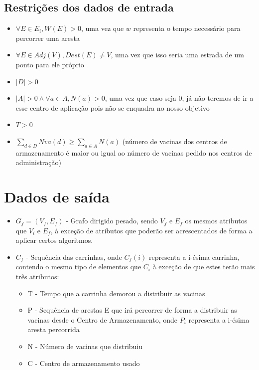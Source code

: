 \documentclass[12pt,a4paper]{report}
\begin{document}
		\subsection{Restrições dos dados de entrada}
		\begin{itemize}
			\item \( \forall E \in E_i, W(E) > 0 \), uma vez que \( w \) representa o tempo necessário para percorrer uma aresta
			\item \( \forall E \in Adj(V), Dest(E) \neq V \), uma vez que isso seria uma estrada de um ponto para ele próprio
			\item \( |D| > 0 \)
			\item \(|A| > 0 \land \forall a \in A, N(a) > 0 \), uma vez que caso seja 0, já não teremos de ir a esse centro de aplicação pois não se enquadra no nosso objetivo
			\item \(T > 0\)
			\item \(\sum_{d \in D} Nva(d) \geq \sum_{a \in A} N(a) \) (número de vacinas dos centros de armazenamento é maior ou igual ao número de vacinas pedido nos centros de administração)
		\end{itemize}


	\section{Dados de saída}
	\begin{itemize}
		\item \( G_f = (V_f, E_f) \) - Grafo dirigido pesado, sendo \( V_f \) e \( E_f \) os mesmos atributos que \( V_i \) e \( E_f \), à exceção de atributos que poderão ser acrescentados de forma a aplicar certos algoritmos.
		\item \(C_f\) - Sequência das carrinhas, onde \( C_f(i) \) representa a i-ésima carrinha, contendo o mesmo tipo de elementos que \( C_i \) à exceção de que estes terão mais três atributos:
		\begin{itemize}
			\item T - Tempo que a carrinha demorou a distribuir as vacinas
			\item P - Sequência de arestas E que irá percorrer de forma a distribuir as vacinas desde o Centro de Armazenamento, onde \( P_i \) representa a i-ésima aresta percorrida
			\item N - Número de vacinas que distribuiu
			\item C - Centro de armazenamento usado
		\end{itemize}
	\end{itemize}
\end{document}
